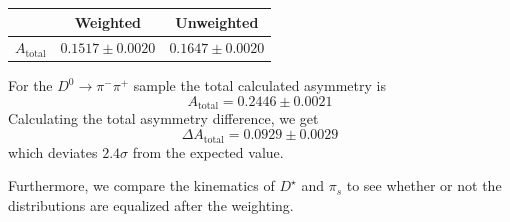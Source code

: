 \documentclass{article}
\begin{document}
    \begin{center}
        \begin{tabular}{c|c|c}
             & Weighted & Unweighted\\
             \hline\hline
            $A_{\text{total}}$ & $0.1517 \pm 0.0020$ & $0.1647 \pm 0.0020$\\
        \end{tabular}
    \end{center}

    For the $D^0\to \pi^-\pi^+$ sample the total calculated asymmetry is
    \begin{equation}
        A_{\text{total}} = 0.2446 \pm 0.0021
    \end{equation}
    Calculating the total asymmetry difference, we get
    \begin{equation}
        \Delta A_{\text{total}} = 0.0929 \pm 0.0029
    \end{equation}
    which deviates $2.4\sigma$ from the expected value.

    Furthermore, we compare the kinematics of $D^\star$ and $\pi_s$ to see whether or not the distributions are equalized after the weighting.
\end{document}
